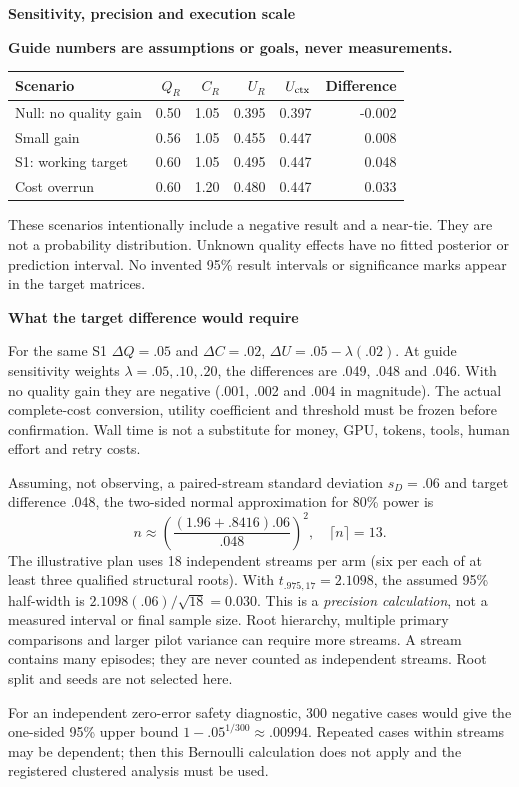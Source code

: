 \documentclass[10pt,a4paper]{article}
\newcommand{\status}{\textcolor{red!70!black}{\textbf{Guide numbers are assumptions or goals, never measurements.}}}
\newcommand{\lead}[1]{\vspace{4pt}\textbf{#1}\par}
\begin{document}
\clearpage
\lead{Sensitivity, precision and execution scale}
\status
\begin{center}\small
\begin{tabular}{@{}lrrrrr@{}}\toprule
Scenario & $Q_R$ & $C_R$ & $U_R$ & $U_{\rm ctx}$ & Difference\\\midrule
Null: no quality gain & 0.50 & 1.05 & 0.395 & 0.397 & -0.002\\
Small gain & 0.56 & 1.05 & 0.455 & 0.447 & 0.008\\
S1: working target & 0.60 & 1.05 & 0.495 & 0.447 & 0.048\\
Cost overrun & 0.60 & 1.20 & 0.480 & 0.447 & 0.033\\
\bottomrule\end{tabular}\end{center}
These scenarios intentionally include a negative result and a near-tie. They
are not a probability distribution. Unknown quality effects have no fitted
posterior or prediction interval. No invented 95\% result intervals or
significance marks appear in the target matrices.

\lead{What the target difference would require}
For the same S1 $\Delta Q=.05$ and $\Delta C=.02$,
$\Delta U=.05-\lambda(.02)$. At guide sensitivity weights
$\lambda=.05,.10,.20$, the differences are .049, .048 and .046.
With no quality gain they are negative (.001, .002 and .004 in magnitude).
The actual complete-cost conversion, utility coefficient and threshold must be
frozen before confirmation. Wall time is not a substitute for money, GPU,
tokens, tools, human effort and retry costs.

Assuming, not observing, a paired-stream standard deviation $s_D=.06$ and
target difference .048, the two-sided normal approximation for 80\% power is
\[
 n\approx\left(\frac{(1.96+.8416).06}{.048}\right)^2,
 \quad \lceil n\rceil=13.
\]
The illustrative plan uses 18 independent streams per arm (six per each of at
least three qualified structural roots). With $t_{.975,17}=2.1098$, the assumed
95\% half-width is $2.1098(.06)/\sqrt{18}=0.030$.
This is a \emph{precision calculation}, not a measured interval or final sample
size. Root hierarchy, multiple primary comparisons and larger pilot variance
can require more streams. A stream contains many episodes; they are never
counted as independent streams. Root split and seeds are not selected here.

For an independent zero-error safety diagnostic, 300 negative cases would give
the one-sided 95\% upper bound $1-.05^{1/300}\approx.00994$.
Repeated cases within streams may be dependent; then this Bernoulli calculation
does not apply and the registered clustered analysis must be used.
\end{document}
